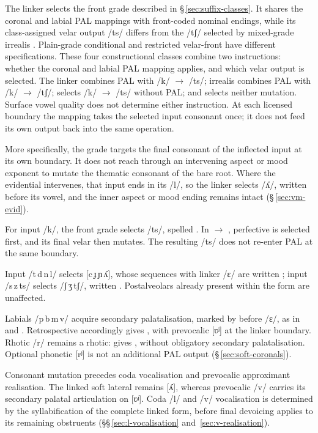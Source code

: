 The linker selects the front grade described in
§\,\ref{sec:suffix-classes}. It shares the coronal and labial PAL mappings
with front-coded nominal endings, while its class-assigned velar output /ts/
differs from the /tʃ/ selected by mixed-grade irrealis .
Plain-grade conditional  and restricted velar-front 
have different specifications. These four constructional classes combine two
instructions: whether the coronal and labial PAL mapping applies, and which
velar output is selected. The linker combines PAL with /k/ $\rightarrow$ /ts/;
irrealis  combines PAL with /k/ $\rightarrow$ /tʃ/;
 selects /k/ $\rightarrow$ /ts/ without PAL; and 
selects neither mutation. Surface vowel quality does not determine either
instruction. At each licensed boundary the mapping takes the selected input
consonant once; it does not feed its own output back into the same operation.

More specifically, the grade targets the final consonant of the inflected
input at its own boundary. It does not reach through an intervening aspect or mood exponent
to mutate the thematic consonant of the bare root. Where the evidential
intervenes, that input ends in its /l/, so the linker selects /ʎ/, written
 before its vowel, and the inner aspect or mood ending remains intact
(§\,\ref{sec:vm-evid}).

For input /k/, the front grade selects /ts/, spelled .
In  $\rightarrow$ , perfective
 is selected first, and its final velar then mutates.
The resulting /ts/ does not re-enter PAL at the same boundary.

Input /t\,d\,n\,l/ selects [c\,ɟ\,ɲ\,ʎ], whose sequences with
linker /ɛ/ are written ; input /s\,z\,ts/ selects /ʃ\,ʒ\,tʃ/, written
.
Postalveolars already present within the form are unaffected.

Labials /p\,b\,m\,v/ acquire secondary palatalisation, marked by
 before /ɛ/, as in  and .
Retrospective  accordingly gives ,
with prevocalic [ʋʲ] at the linker boundary.
Rhotic /r/ remains a rhotic:  gives ,
without obligatory secondary palatalisation. Optional phonetic [rʲ]
is not an additional PAL output (§\,\ref{sec:soft-coronals}).

Consonant mutation precedes coda vocalisation and prevocalic approximant
realisation. The linked soft lateral remains [ʎ], whereas prevocalic /v/ carries its secondary
palatal articulation on [ʋʲ]. Coda /l/ and /v/ vocalisation is determined
by the syllabification of the complete linked form, before final devoicing
applies to its remaining obstruents
(§§\,\ref{sec:l-vocalisation} and~\ref{sec:v-realisation}).

